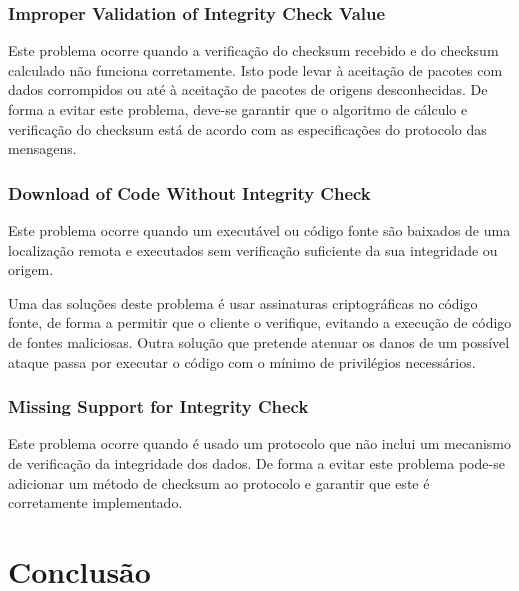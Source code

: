 \documentclass[11t]{article}
\begin{document}
\vspace{0.5cm}

\subsubsection*{Improper Validation of Integrity Check Value}

Este problema ocorre quando a verificação do checksum recebido e do checksum calculado não funciona corretamente. Isto pode levar à aceitação de pacotes com dados corrompidos ou até à aceitação de pacotes de origens desconhecidas. De forma a evitar este problema, deve-se garantir que o algoritmo de cálculo e verificação do checksum está de acordo com as especificações do protocolo das mensagens. \cite{ref_ex5_1}

\vspace{0.5cm}

\subsubsection*{Download of Code Without Integrity Check}

Este problema ocorre quando um executável ou código fonte são baixados de uma localização remota e executados sem verificação suficiente da sua integridade ou origem.

Uma das soluções deste problema é usar assinaturas criptográficas no código fonte, de forma a permitir que o cliente o verifique, evitando a execução de código de fontes maliciosas. Outra solução que pretende atenuar os danos de um possível ataque passa por executar o código com o mínimo de privilégios necessários. \cite{ref_ex5_2}

\vspace{0.5cm}

\subsubsection*{Missing Support for Integrity Check}

Este problema ocorre quando é usado um protocolo que não inclui um mecanismo de verificação da integridade dos dados. De forma a evitar este problema pode-se adicionar um método de checksum ao protocolo e garantir que este é corretamente implementado. \cite{ref_ex5_3}



\clearpage
\section{Conclusão}
\end{document}
